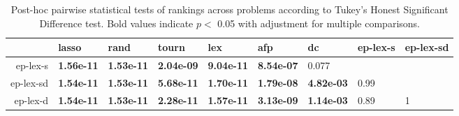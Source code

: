 \begin{table}[ht]
\centering
\caption{Post-hoc pairwise statistical tests of rankings across problems according to Tukey's Honest Significant Difference test. Bold values indicate $p<$ 0.05 with adjustment for multiple comparisons.} 
\label{tbl:hsd}
\begingroup\footnotesize
\begin{tabular}{rllllllll}
  \toprule
 & lasso & rand & tourn & lex & afp & dc & ep-lex-s & ep-lex-sd \\ 
  \midrule
ep-lex-s & {\bf 1.56e-11} & {\bf 1.53e-11} & {\bf 2.04e-09} & {\bf 9.04e-11} & {\bf 8.54e-07} & 0.077 &  &  \\ 
  ep-lex-sd & {\bf 1.54e-11} & {\bf 1.53e-11} & {\bf 5.68e-11} & {\bf 1.70e-11} & {\bf 1.79e-08} & {\bf 4.82e-03} & 0.99 &  \\ 
  ep-lex-d & {\bf 1.54e-11} & {\bf 1.53e-11} & {\bf 2.28e-11} & {\bf 1.57e-11} & {\bf 3.13e-09} & {\bf 1.14e-03} & 0.89 &   1 \\ 
   \bottomrule
\end{tabular}
\endgroup
\end{table}

